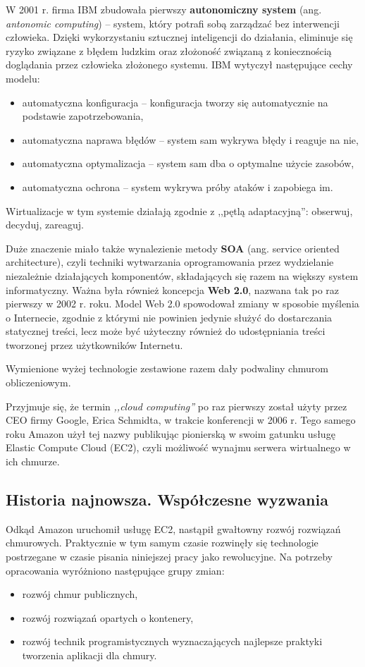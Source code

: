 \documentclass[12pt,a4paper,twoside,titlepage,openright]{book}
\begin{document}
W 2001 r. firma IBM zbudowała pierwszy \textbf{autonomiczny system} (ang. \textit{antonomic computing}) -- system, który potrafi sobą zarządzać bez interwencji człowieka. Dzięki wykorzystaniu sztucznej inteligencji do działania, eliminuje się ryzyko związane z błędem ludzkim oraz złożoność związaną z koniecznością doglądania przez człowieka złożonego systemu. IBM wytyczył następujące cechy modelu:
\begin{itemize}
\item automatyczna konfiguracja -- konfiguracja tworzy się automatycznie na podstawie zapotrzebowania,
\item automatyczna naprawa błędów -- system sam wykrywa błędy i reaguje na nie,
\item automatyczna optymalizacja -- system sam dba o optymalne użycie zasobów,
\item automatyczna ochrona -- system wykrywa próby ataków i zapobiega im.
\end{itemize}
Wirtualizacje w tym systemie działają zgodnie z ,,pętlą adaptacyjną'': obserwuj, decyduj, zareaguj.\cite{ccSpringer}


Duże znaczenie miało także wynalezienie metody \textbf{SOA} (ang. service oriented architecture), czyli techniki wytwarzania oprogramowania przez wydzielanie niezależnie działających komponentów, składających się razem na większy system informatyczny. Ważna była również koncepcja \textbf{Web 2.0}, nazwana tak po raz pierwszy w 2002 r. roku. Model Web 2.0 spowodował zmiany w sposobie myślenia o Internecie, zgodnie z którymi nie powinien jedynie służyć do dostarczania statycznej treści, lecz może być użyteczny również do udostępniania treści tworzonej przez użytkowników Internetu.

Wymienione wyżej technologie zestawione razem dały podwaliny chmurom obliczeniowym.

Przyjmuje się, że termin \textit{,,cloud computing''} po raz pierwszy został użyty przez CEO firmy Google, Erica Schmidta, w trakcie konferencji w 2006 r. Tego samego roku Amazon użył tej nazwy publikując pionierską w swoim gatunku usługę Elastic Compute Cloud (EC2), czyli możliwość wynajmu serwera wirtualnego w ich chmurze.

\subsection{Historia najnowsza. Współczesne wyzwania}

Odkąd Amazon uruchomił usługę EC2, nastąpił gwałtowny rozwój rozwiązań chmurowych. Praktycznie w tym samym czasie rozwinęły się technologie postrzegane w czasie pisania niniejszej pracy jako rewolucyjne. Na potrzeby opracowania wyróżniono następujące grupy zmian:
\begin{itemize}
\item rozwój chmur publicznych,
\item rozwój rozwiązań opartych o kontenery,
\item rozwój technik programistycznych wyznaczających najlepsze praktyki tworzenia aplikacji dla chmury.
\end{itemize}
\end{document}
